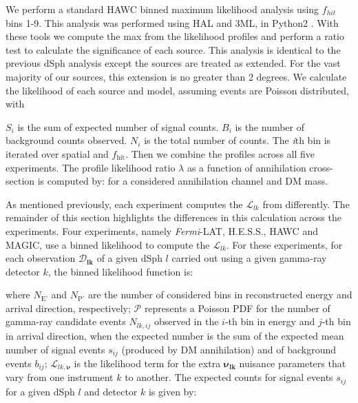 We perform a standard HAWC binned maximum likelihood analysis using $f_{hit}$ bins 1-9.
This analysis was performed using HAL and 3ML, in Python2 \cite{Abeysekara_2017, vianello2015multimission}.
With these tools we compute the max from the likelihood profiles and perform a ratio test to calculate the significance of each source.
This analysis is identical to the previous dSph analysis \cite{Albert_2018} except the sources are treated as extended.
For the vast majority of our sources, this extension is no greater than 2 degrees.
We calculate the likelihood of each source and model, assuming events are Poisson distributed, with
\hwcpsLLH

$S_i$ is the sum of expected number of signal counts.
$B_i$ is the number of background counts observed.
$N_i$ is the total number of counts.
The \textit{i}th bin is iterated over spatial and $f_{\textrm{hit}}$.
Then we combine the profiles across all five experiments.
The profile likelihood ratio $\lambda$ as a function of annihilation cross-section \sv is computed by:
\gdLLHratio
for a considered annihilation channel and DM mass.

As mentioned previously, each experiment computes the $\mathcal{L}_{lk}$ from  differently.
The remainder of this section highlights the differences in this calculation across the experiments.
Four experiments, namely \textit{Fermi}-LAT, H.E.S.S., HAWC and MAGIC, use a binned likelihood to compute the $\mathcal{L}_{lk}$.
For these experiments, for each observation $\bm{\mathcal{D}_{lk}}$ of a given dSph $l$ carried out using a given gamma-ray detector $k$, the binned likelihood function is:
\gdJointLLH

where $N_{\text{E'}}$ and $N_{\text{P'}}$ are the number of considered bins in reconstructed energy and arrival direction, respectively; $\mathcal{P}$ represents a Poisson PDF for the number of gamma-ray candidate events $ N_{lk,ij} $ observed in the $i$-th bin in energy and $j$-th bin in arrival direction, when the expected number is the sum of the expected mean number of signal events $ s_{ij} $ (produced by DM annihilation) and of background events $ b_{ij} $; $ \mathcal{L}_{lk,\bm{\nu}} $ is the likelihood term for the extra $ \bm{\nu_{lk}} $ nuisance parameters that vary from one instrument $k$ to another.
The expected counts for signal events $s_{ij}$ for a given dSph $l$ and detector $k$ is given by:

\gdExpectedNS


